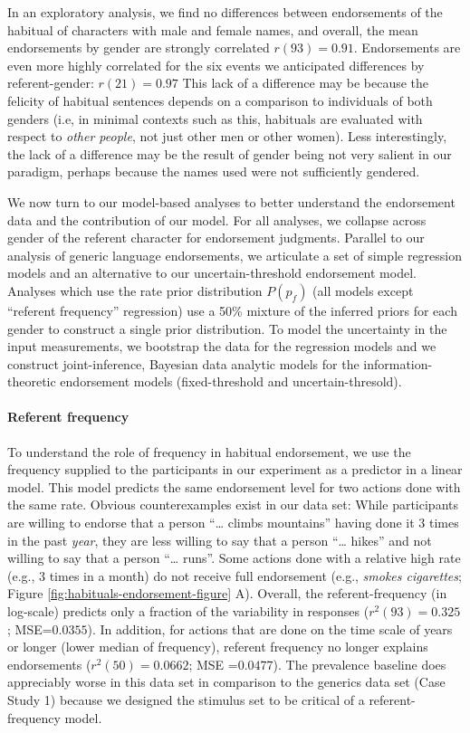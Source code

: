\documentclass[english,floatsintext,man]{apa6}
\theoremstyle{definition}
\theoremstyle{definition}
\theoremstyle{definition}
\theoremstyle{remark}
\begin{document}
In an exploratory analysis, we find no differences between endorsements
of the habitual of characters with male and female names, and overall,
the mean endorsements by gender are strongly correlated
\(r(93) = 0.91\). Endorsements are even more highly correlated for the
six events we anticipated differences by referent-gender:
\(r(21) = 0.97\) This lack of a difference may be because the felicity
of habitual sentences depends on a comparison to individuals of both
genders (i.e, in minimal contexts such as this, habituals are evaluated
with respect to \emph{other people}, not just other men or other women).
Less interestingly, the lack of a difference may be the result of gender
being not very salient in our paradigm, perhaps because the names used
were not sufficiently gendered.

We now turn to our model-based analyses to better understand the
endorsement data and the contribution of our model. For all analyses, we
collapse across gender of the referent character for endorsement
judgments. Parallel to our analysis of generic language endorsements, we
articulate a set of simple regression models and an alternative to our
uncertain-threshold endorsement model. Analyses which use the rate prior
distribution \(P(p_f)\) (all models except \enquote{referent frequency}
regression) use a 50\% mixture of the inferred priors for each gender to
construct a single prior distribution. To model the uncertainty in the
input measurements, we bootstrap the data for the regression models and
we construct joint-inference, Bayesian data analytic models for the
information-theoretic endorsement models (fixed-threshold and
uncertain-thresold).

\paragraph{Referent frequency}\label{referent-frequency}

To understand the role of frequency in habitual endorsement, we use the
frequency supplied to the participants in our experiment as a predictor
in a linear model. This model predicts the same endorsement level for
two actions done with the same rate. Obvious counterexamples exist in
our data set: While participants are willing to endorse that a person
\enquote{\ldots{} climbs mountains} having done it 3 times in the past
\emph{year}, they are less willing to say that a person
\enquote{\ldots{} hikes} and not willing to say that a person
\enquote{\ldots{} runs}. Some actions done with a relative high rate
(e.g., 3 times in a month) do not receive full endorsement (e.g.,
\emph{smokes cigarettes}; Figure \ref{fig:habituals-endorsement-figure}
A). Overall, the referent-frequency (in log-scale) predicts only a
fraction of the variability in responses (\(r^2(93) = 0.325\);
MSE=\(0.0355\)). In addition, for actions that are done on the time
scale of years or longer (lower median of frequency), referent frequency
no longer explains endorsements (\(r^2(50) = 0.0662\); MSE =\(0.0477\)).
The prevalence baseline does appreciably worse in this data set in
comparison to the generics data set (Case Study 1) because we designed
the stimulus set to be critical of a referent-frequency model.
\end{document}
